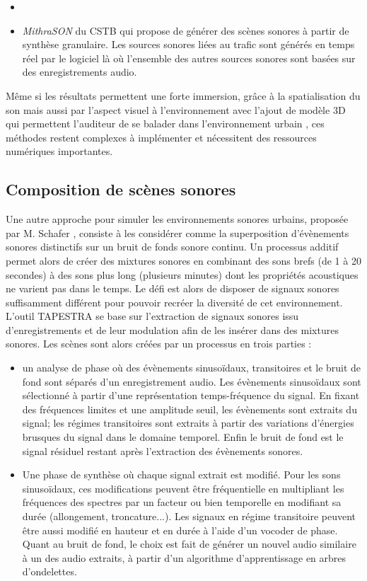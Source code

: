 \begin{itemize}
\item
\item \textit{MithraSON} du CSTB qui propose de générer des scènes sonores à partir de synthèse granulaire. Les sources sonores liées au trafic sont générés en temps réel par le logiciel là où l'ensemble des autres sources sonores sont basées sur des enregistrements audio. 
\end{itemize}


Même si les résultats permettent une forte immersion, grâce à la spatialisation du son mais aussi par l'aspect visuel à l'environnement avec l'ajout de modèle 3D qui permettent l'auditeur de se \og balader \fg{} dans l'environnement urbain \cite{stienen2015auralization}, ces méthodes restent complexes à implémenter et nécessitent des ressources numériques importantes.

\subsection{Composition de scènes sonores}

Une autre approche pour simuler les environnements sonores urbains, proposée par M. Schafer \cite{schafer1993soundscape}, consiste à les considérer comme la superposition d'évènements sonores distinctifs sur un bruit de fonds sonore continu. Un processus additif permet alors de créer des mixtures sonores en combinant des sons brefs (de 1 à 20 secondes) à des sons plus long (plusieurs minutes) dont les propriétés acoustiques ne varient pas dans le temps. Le défi est alors de disposer de signaux sonores suffisamment différent pour pouvoir recréer la diversité de cet environnement. L'outil TAPESTRA \cite{misra_musical_2007} se base sur l'extraction de signaux sonores issu d'enregistrements et de leur modulation afin de les insérer dans des mixtures sonores. Les scènes sont alors créées par un processus en trois parties : 

\begin{itemize}
\item un analyse de phase où des évènements sinusoïdaux, transitoires et le bruit de fond sont séparés d'un enregistrement audio. Les évènements sinusoïdaux sont sélectionné à partir d'une représentation temps-fréquence du signal. En fixant des fréquences limites et une amplitude seuil, les évènements sont extraits du signal; les régimes transitoires sont extraits à partir des variations d'énergies brusques du signal dans le domaine temporel. Enfin le bruit de fond est le signal résiduel restant après l'extraction des évènements sonores.
\item Une phase de synthèse où chaque signal extrait est modifié. Pour les sons sinusoïdaux, ces modifications peuvent être fréquentielle en multipliant les fréquences des spectres par un facteur ou bien temporelle en modifiant sa durée (allongement, troncature...). Les signaux en régime transitoire peuvent être aussi modifié en hauteur et en durée à l'aide d'un vocoder de phase. Quant au bruit de fond, le choix est fait de générer un nouvel audio similaire à un des audio extraits, à partir d'un algorithme d'apprentissage en arbres d'ondelettes. 
\end{itemize}  


